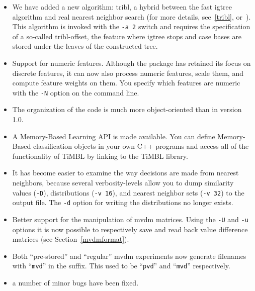 \documentclass{report}
\begin{document}
\begin{itemize}

\item We have added a new algorithm: {\sc tribl}, a hybrid between
the fast {\sc igtree} algorithm and real nearest neighbor search (for
more details, see~\ref{tribl}, or~). This
algorithm is invoked with the {\tt -a 2} switch and requires the
specification of a so-called {\sc tribl}-offset, the feature where
{\sc igtree} stops and case bases are stored under the leaves of the
constructed tree.

\item Support for numeric features. Although the package has retained
its focus on discrete features, it can now also process numeric
features, scale them, and compute feature weights on them. You
specify which features are numeric with the {\tt -N} option on the
command line.

\item The organization of the code is much more object-oriented than
in version 1.0. 

\item A Memory-Based Learning API is made available. You can define
Memory-Based classification objects in your own C++ programs and
access all of the functionality of TiMBL by linking to the TiMBL
library.

\item It has become easier to examine the way decisions are made from
nearest neighbors, because several verbosity-levels allow you to dump
similarity values ({\tt -D}), distributions ({\tt -v 16}), and nearest
neighbor sets ({\tt -v 32}) to the output file. The {\tt -d} option
for writing the distributions no longer exists.

\item Better support for the manipulation of {\sc mvdm}
matrices. Using the {\tt -U} and {\tt -u} options it is now possible
to respectively save and read back value difference matrices (see
Section~\ref{mvdmformat}).

\item Both ``pre-stored'' and ``regular'' {\sc mvdm} experiments now
generate filenames with ``{\tt mvd}'' in the suffix. This used to be
``{\tt pvd}'' and ``{\tt mvd}'' respectively.

\item a number of minor bugs have been fixed.

\end{itemize}
\end{document}
